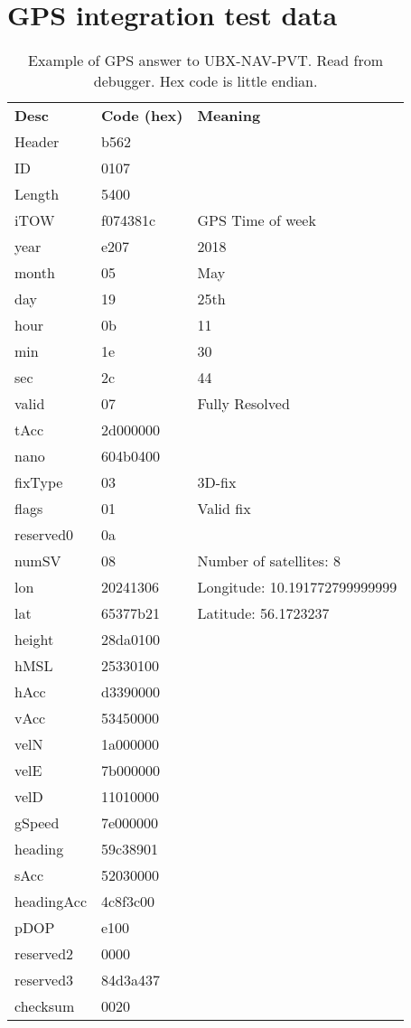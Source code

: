 \chapter{GPS integration test data}
\label{app:GPSinttest}

\begin{table}[H]
	\centering
	\setlength{\extrarowheight}{0pt}
	\begin{tabularx}{0.8\textwidth}{p{2cm} p{2cm} X}
		\oldtoprule
		\textbf{Desc} & \textbf{Code (hex)} & \textbf{Meaning} \\
		\oldmidrule
		Header & b562 & \\
		ID & 0107 & \\
		Length & 5400 & \\
		iTOW & f074381c & GPS Time of week \\
		year & e207 & 2018 \\
		month & 05 & May \\
		day & 19 & 25th \\
		hour & 0b & 11 \\
		min & 1e & 30 \\
		sec & 2c & 44 \\
		valid & 07 & Fully Resolved \\
		tAcc & 2d000000 & \\
		nano & 604b0400 & \\
		fixType & 03 & 3D-fix \\
		flags & 01 & Valid fix \\
		reserved0 & 0a & \\
		numSV & 08 & Number of satellites: 8 \\
		lon & 20241306 & Longitude: \num{10.191772799999999} \\
		lat & 65377b21 & Latitude: \num{56.1723237} \\
		height & 28da0100 & \\
		hMSL & 25330100 & \\
		hAcc & d3390000 & \\
		vAcc & 53450000 & \\
		velN & 1a000000 & \\
		velE & 7b000000 & \\
		velD & 11010000 & \\
		gSpeed & 7e000000 & \\
		heading & 59c38901 & \\
		sAcc & 52030000 & \\
		headingAcc & 4c8f3c00 & \\
		pDOP & e100 & \\
		reserved2 & 0000 & \\
		reserved3 & 84d3a437 & \\
		checksum & 0020 & \\
		\bottomrule
	\end{tabularx}
	\caption{Example of GPS answer to UBX-NAV-PVT\cite[p.~160-161]{NEO7_proto}. Read from debugger. Hex code is little endian.}
	\label{tab:GPSintdata}
\end{table}

